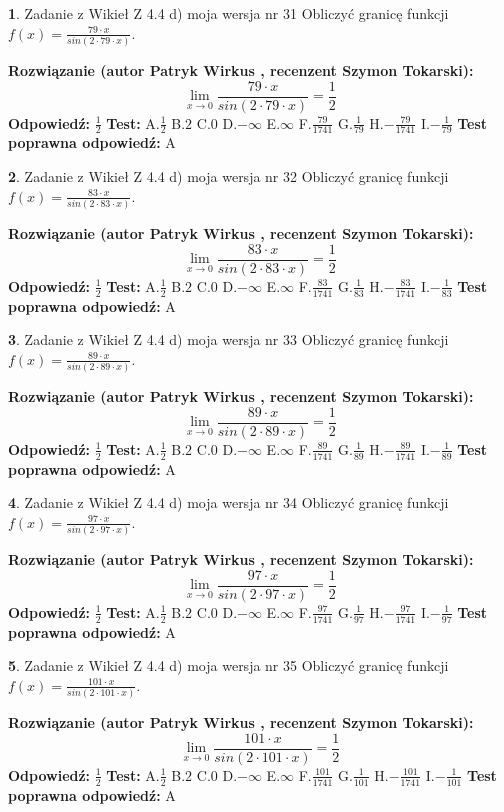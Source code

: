 \documentclass[12pt, a4paper]{article}
\theoremstyle{definition} %
\newtheorem{zad}{}
\newcommand{\zadStart}[1]{\begin{zad}#1\newline}
\newcommand{\zadStop}{\end{zad}}
\newcommand{\rozwStart}[2]{\noindent \textbf{Rozwiązanie (autor #1 , recenzent #2): }\newline}
\newcommand{\rozwStop}{\newline}
\newcommand{\odpStart}{\noindent \textbf{Odpowiedź:}\newline}
\newcommand{\odpStop}{\newline}
\newcommand{\testStart}{\noindent \textbf{Test:}\newline}
\newcommand{\testStop}{\newline}
\newcommand{\kluczStart}{\noindent \textbf{Test poprawna odpowiedź:}\newline}
\newcommand{\kluczStop}{\newline}
\begin{document}
\zadStart{Zadanie z Wikieł Z 4.4 d) moja wersja nr 31}
Obliczyć granicę funkcji $f(x)=\frac{79\cdot x}{sin(2 \cdot79\cdot x)}$.
\zadStop
\rozwStart{Patryk Wirkus}{Szymon Tokarski}
$$\lim\limits_{x\to 0}\frac{79\cdot x}{sin(2 \cdot79\cdot x)}=\frac{1}{2}$$
\rozwStop
\odpStart
$\frac{1}{2}$
\odpStop
\testStart
A.$\frac{1}{2}$
B.$2$
C.$0$
D.$-\infty$
E.$\infty$
F.$\frac{79}{1741}$
G.$\frac{1}{79}$
H.$-\frac{79}{1741}$
I.$-\frac{1}{79}$
\testStop
\kluczStart
A
\kluczStop



\zadStart{Zadanie z Wikieł Z 4.4 d) moja wersja nr 32}
Obliczyć granicę funkcji $f(x)=\frac{83\cdot x}{sin(2 \cdot83\cdot x)}$.
\zadStop
\rozwStart{Patryk Wirkus}{Szymon Tokarski}
$$\lim\limits_{x\to 0}\frac{83\cdot x}{sin(2 \cdot83\cdot x)}=\frac{1}{2}$$
\rozwStop
\odpStart
$\frac{1}{2}$
\odpStop
\testStart
A.$\frac{1}{2}$
B.$2$
C.$0$
D.$-\infty$
E.$\infty$
F.$\frac{83}{1741}$
G.$\frac{1}{83}$
H.$-\frac{83}{1741}$
I.$-\frac{1}{83}$
\testStop
\kluczStart
A
\kluczStop



\zadStart{Zadanie z Wikieł Z 4.4 d) moja wersja nr 33}
Obliczyć granicę funkcji $f(x)=\frac{89\cdot x}{sin(2 \cdot89\cdot x)}$.
\zadStop
\rozwStart{Patryk Wirkus}{Szymon Tokarski}
$$\lim\limits_{x\to 0}\frac{89\cdot x}{sin(2 \cdot89\cdot x)}=\frac{1}{2}$$
\rozwStop
\odpStart
$\frac{1}{2}$
\odpStop
\testStart
A.$\frac{1}{2}$
B.$2$
C.$0$
D.$-\infty$
E.$\infty$
F.$\frac{89}{1741}$
G.$\frac{1}{89}$
H.$-\frac{89}{1741}$
I.$-\frac{1}{89}$
\testStop
\kluczStart
A
\kluczStop



\zadStart{Zadanie z Wikieł Z 4.4 d) moja wersja nr 34}
Obliczyć granicę funkcji $f(x)=\frac{97\cdot x}{sin(2 \cdot97\cdot x)}$.
\zadStop
\rozwStart{Patryk Wirkus}{Szymon Tokarski}
$$\lim\limits_{x\to 0}\frac{97\cdot x}{sin(2 \cdot97\cdot x)}=\frac{1}{2}$$
\rozwStop
\odpStart
$\frac{1}{2}$
\odpStop
\testStart
A.$\frac{1}{2}$
B.$2$
C.$0$
D.$-\infty$
E.$\infty$
F.$\frac{97}{1741}$
G.$\frac{1}{97}$
H.$-\frac{97}{1741}$
I.$-\frac{1}{97}$
\testStop
\kluczStart
A
\kluczStop



\zadStart{Zadanie z Wikieł Z 4.4 d) moja wersja nr 35}
Obliczyć granicę funkcji $f(x)=\frac{101\cdot x}{sin(2 \cdot101\cdot x)}$.
\zadStop
\rozwStart{Patryk Wirkus}{Szymon Tokarski}
$$\lim\limits_{x\to 0}\frac{101\cdot x}{sin(2 \cdot101\cdot x)}=\frac{1}{2}$$
\rozwStop
\odpStart
$\frac{1}{2}$
\odpStop
\testStart
A.$\frac{1}{2}$
B.$2$
C.$0$
D.$-\infty$
E.$\infty$
F.$\frac{101}{1741}$
G.$\frac{1}{101}$
H.$-\frac{101}{1741}$
I.$-\frac{1}{101}$
\testStop
\kluczStart
A
\kluczStop
\end{document}
